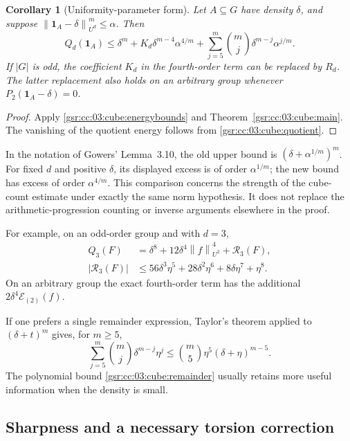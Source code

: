 \documentclass[11pt,letterpaper]{article}
\numberwithin{equation}{section}
\newtheorem{corollary}[theorem]{Corollary}
\theoremstyle{definition}
\theoremstyle{remark}
\newcommand{\1}{\mathbf 1}
\newcommand{\norm}[1]{\left\|#1\right\|}
\begin{document}
\begin{corollary}[Uniformity-parameter form]
\label{gsr:cc:03:cube:alpha}
Let $A\subseteq G$ have density $\delta$, and suppose
$\norm{\1_A-\delta}_{U^d}^{m}\leq\alpha$.  Then
\begin{equation}
 Q_d(\1_A)\leq
 \delta^m+K_d\delta^{m-4}\alpha^{4/m}
 +\sum_{j=5}^{m}\binom mj\delta^{m-j}\alpha^{j/m}.
 \label{gsr:cc:03:cube:alphauniversal}
\end{equation}
If $|G|$ is odd, the coefficient $K_d$ in the fourth-order term can be
replaced by $R_d$.  The latter replacement also holds on an arbitrary
group whenever $P_2(\1_A-\delta)=0$.
\end{corollary}

\begin{proof}
Apply \eqref{gsr:cc:03:cube:energybounds} and
Theorem~\ref{gsr:cc:03:cube:main}.  The vanishing of the quotient energy follows
from \eqref{gsr:cc:03:cube:quotient}.
\end{proof}

In the notation of Gowers' Lemma~3.10, the old upper bound is
$(\delta+\alpha^{1/m})^m$.  For fixed $d$ and positive $\delta$, its
displayed excess is of order $\alpha^{1/m}$; the new bound has excess
of order $\alpha^{4/m}$.  This comparison concerns the strength of the
cube-count estimate under exactly the same norm hypothesis.  It does
not replace the arithmetic-progression counting or inverse arguments
elsewhere in the proof.

For example, on an odd-order group and with $d=3$,
\begin{align}
 Q_3(F)&=\delta^8+12\delta^4\norm f_{U^2}^4+\mathcal R_3(F),
 \label{gsr:cc:03:cube:d3example}\\
 |\mathcal R_3(F)|&\leq
 56\delta^3\eta^5+28\delta^2\eta^6+8\delta\eta^7+\eta^8.
 \label{gsr:cc:03:cube:d3error}
\end{align}
On an arbitrary group the exact fourth-order term has the additional
$2\delta^4\mathcal E_{(2)}(f)$.

If one prefers a single remainder expression, Taylor's theorem applied
to $(\delta+t)^m$ gives, for $m\geq5$,
\begin{equation}
 \sum_{j=5}^{m}\binom mj\delta^{m-j}\eta^j
 \leq\binom m5\eta^5(\delta+\eta)^{m-5}.
 \label{gsr:cc:03:cube:compactremainder}
\end{equation}
The polynomial bound \eqref{gsr:cc:03:cube:remainder} usually retains more useful
information when the density is small.

\subsection{Sharpness and a necessary torsion correction}
\end{document}
